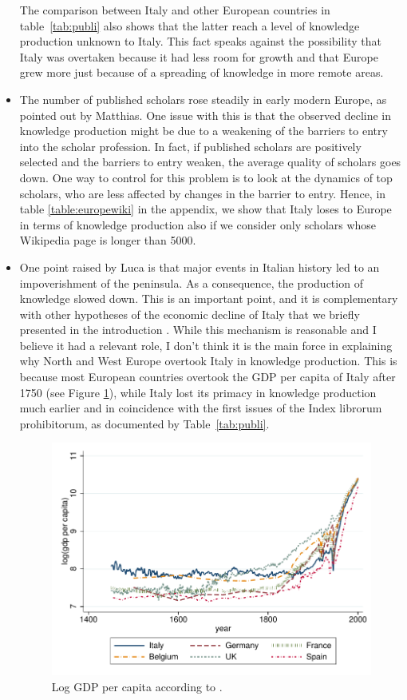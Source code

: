 \begin{itemize}
The comparison between Italy and other European countries in table~\ref{tab:publi} also shows that the latter reach a level of knowledge production unknown to Italy. This fact speaks against the possibility that Italy was overtaken because it had less room for growth and that Europe grew more just because of a spreading of knowledge in more remote areas. 

\item The number of published scholars rose steadily in early modern Europe, as pointed out by Matthias. One issue with this is that the observed decline in knowledge production might be due to a weakening of the barriers to entry into the scholar profession. In fact, if published scholars are positively selected and the barriers to entry weaken, the average quality of scholars goes down. One way to control for this problem is to look at the dynamics of top scholars, who are less affected by changes in the barrier to entry. Hence, in table \ref{table:europewiki} in the appendix, we show that Italy loses to Europe in terms of knowledge production also if we consider only scholars whose Wikipedia page is longer than 5000.

	\item One point raised by Luca is that major events in Italian history led to an impoverishment of the peninsula. As a consequence, the production of knowledge slowed down. This is an important point, and it is complementary with other hypotheses of the economic decline of Italy that we briefly presented in the introduction \cite{land99,braudel2018,gusdorf1971}. While this mechanism is reasonable and I believe it had a relevant role, I don't think it is the main force in explaining why North and West Europe overtook Italy in knowledge production. This is because most European countries overtook the GDP per capita of Italy after 1750 (see Figure \ref{fig:gdppc}), while Italy lost its primacy in knowledge production much earlier and in coincidence with the first issues of the Index librorum prohibitorum, as documented by Table~\ref{tab:publi}. 
\begin{figure}[ht]
	\centering
	\includegraphics[width=0.7\linewidth]{gdppc.pdf}		
	\caption{Log GDP per capita according to \protect{}.}
	\label{fig:gdppc}
\end{figure}
\FloatBarrier


\end{itemize}

